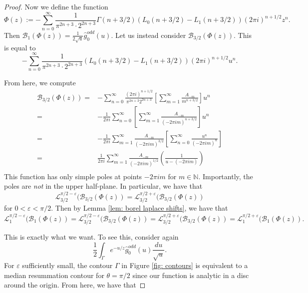 \documentclass[12pt]{amsart}
\theoremstyle{definition}
\theoremstyle{plain}
\numberwithin{equation}{section}
\begin{document}
\begin{proof}
Now we define the function
\[\Phi(z) := -\sum_{n=0}^\infty \frac{1}{\pi^{2n+3} \cdot 2^{2n+3}} \Gamma(n+3/2) \left(L_0(n+3/2)-L_1(n+3/2)\right)(2\pi i)^{n+1/2} z^n.\]
Then $\mathcal{B}_1(\Phi(z)) = \frac{1}{2\sqrt{u}}\widehat{g}_0^{odd}(u)$. 
Let us instead consider $\mathcal{B}_{3/2}(\Phi(z))$. This is equal to 
\[-\sum_{n=0}^\infty \frac{1}{\pi^{2n+3} \cdot 2^{2n+3}} \left(L_0(n+3/2)-L_1(n+3/2)\right)(2\pi i)^{n+1/2} u^n.\]

From here, we compute
\begin{align*}
		\mathcal{B}_{3/2}(\Phi(z)) = &-\sum_{n=0}^\infty \frac{(2\pi i)^{n+1/2}}{\pi^{2n+3}2^{2n+3}} \left[ \sum_{m=1}^\infty \frac{A_{-m}}{m^{n+3/2}}\right]u^{n}\\
	= &-\frac{1}{2\pi i}\sum_{n=0}^\infty \left[ \sum_{m=1}^\infty \frac{A_{-m}}{(-2\pi im)^{n+3/2}}\right]u^{n}\\
	= &-\frac{1}{2\pi i}\sum_{m=1}^\infty \frac{A_{-m}}{(-2\pi i m)^{3/2}} \left[ \sum_{n=0}^\infty \frac{u^n}{(-2\pi im)^{n}}\right]\\
	= &\frac{1}{2\pi i}\sum_{m=1}^\infty \frac{A_{-m}}{(-2\pi i m)^{1/2}} \left( \frac{1}{u-(-2\pi i m)}\right)\\
\end{align*}
This function has only simple poles at points $-2\pi i m$ for $m \in \mathbb{N}$. Importantly, the poles are \textit{not} in the upper half-plane. 
In particular, we have that 
\[\mathcal{L}_{3/2}^{\pi/2-\varepsilon}(\mathcal{B}_{3/2}(\Phi(z)) = \mathcal{L}_{3/2}^{\pi/2+\varepsilon}(\mathcal{B}_{3/2}(\Phi(z))
\]
for $ 0< \varepsilon < \pi/2$. 
Then by Lemma \ref{lem: borel laplace shifts}, we have that 
\[\mathcal{L}_{1}^{\pi/2-\varepsilon}(\mathcal{B}_{1}(\Phi(z)) = \mathcal{L}_{3/2}^{\pi/2-\varepsilon}(\mathcal{B}_{3/2}(\Phi(z)) = \mathcal{L}_{3/2}^{\pi/2+\varepsilon}(\mathcal{B}_{3/2}(\Phi(z)) = \mathcal{L}_{1}^{\pi/2+\varepsilon}(\mathcal{B}_{1}(\Phi(z)).
\]

This is exactly what we want. To see this, consider again
\[\frac{1}{2}\int_{\Gamma}e^{-u/z}\widehat{g}_{0}^{odd}(u)\frac{du}{\sqrt{u}}.\]
For $\varepsilon$ sufficiently small, the contour $\Gamma$ in Figure \ref{fig: contours} is equivalent to a median resummation contour for $\theta=\pi/2$ since our function is analytic in a disc around the origin.
From here, we have that 


\end{proof}
\end{document}
